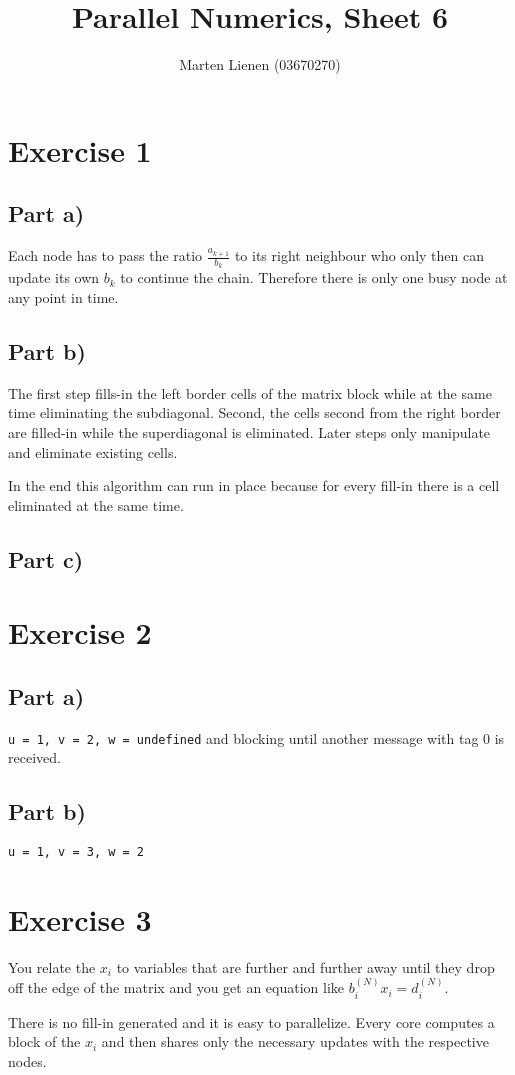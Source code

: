 \documentclass[10pt,a4paper]{article}
\title{Parallel Numerics, Sheet 6}
\author{Marten Lienen (03670270)}
\begin{document}
\maketitle

\section*{Exercise 1}

\subsection*{Part a)}

Each node has to pass the ratio $\frac{a_{k + 1}}{b_{k}}$ to its right neighbour who only then can update its own $b_{k}$ to continue the chain.
Therefore there is only one busy node at any point in time.

\subsection*{Part b)}

The first step fills-in the left border cells of the matrix block while at the same time eliminating the subdiagonal.
Second, the cells second from the right border are filled-in while the superdiagonal is eliminated.
Later steps only manipulate and eliminate existing cells.

In the end this algorithm can run in place because for every fill-in there is a cell eliminated at the same time.

\subsection*{Part c)}

\section*{Exercise 2}

\subsection*{Part a)}

\texttt{u = 1, v = 2, w = undefined} and blocking until another message with tag $0$ is received.

\subsection*{Part b)}

\texttt{u = 1, v = 3, w = 2}

\section*{Exercise 3}

You relate the $x_{i}$ to variables that are further and further away until they drop off the edge of the matrix and you get an equation like $b_{i}^{(N)}x_{i} = d_{i}^{(N)}$.

There is no fill-in generated and it is easy to parallelize.
Every core computes a block of the $x_{i}$ and then shares only the necessary updates with the respective nodes.
\end{document}

